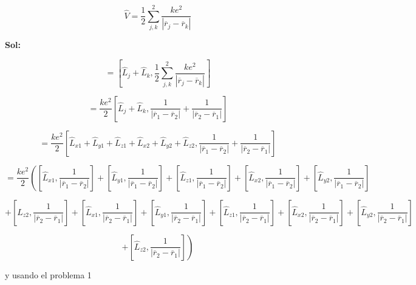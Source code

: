 \documentclass[12pt,a4paper]{article}
\begin{document}
\begin{enumerate}
\begin{equation*}
    \hat{V} = \frac{1}{2} \sum_{j,k}^{2} \frac{ke^2}{|\overline{r}_{j} - \overline{r}_k|}
\end{equation*}

\textbf{Sol:}

\begin{equation*}
    [\hat{L}_{jk},\hat{V}] =\left[\hat{L}_j + \hat{L}_k,\frac{1}{2} \sum_{j,k}^{2} \frac{ke^2}{|\overline{r}_{j} - \overline{r}_k|}\right]
\end{equation*}


\begin{equation*}
    =\frac{ke^2}{2}\left[\hat{L}_j + \hat{L}_k, \frac{1}{|\overline{r}_{1} - \overline{r}_2|} +\frac{1}{|\overline{r}_{2} - \overline{r}_1|}\right]
\end{equation*}

\begin{equation*}
    =\frac{ke^2}{2}\left[\hat{L}_{x1} + \hat{L}_{y1} + \hat{L}_{z1} + \hat{L}_{x2}+ \hat{L}_{y2} + \hat{L}_{z2}, \frac{1}{|\overline{r}_{1} - \overline{r}_2|} +\frac{1}{|\overline{r}_{2} - \overline{r}_1|}\right]
\end{equation*}

\begin{equation*}
    =\frac{ke^2}{2}\left([\hat{L}_{x1},\frac{1}{|\overline{r}_{1} - \overline{r}_2|}] + [\hat{L}_{y1},\frac{1}{|\overline{r}_{1} - \overline{r}_2|}] + [\hat{L}_{z1},\frac{1}{|\overline{r}_{1} - \overline{r}_2|}] + [\hat{L}_{x2},\frac{1}{|\overline{r}_{1} - \overline{r}_2|}]+ [\hat{L}_{y2},\frac{1}{|\overline{r}_{1} - \overline{r}_2|}]  \right.
\end{equation*}

\begin{equation*}
    + [\hat{L}_{z2},\frac{1}{|\overline{r}_{2} - \overline{r}_1|}] +[\hat{L}_{x1},\frac{1}{|\overline{r}_{2} - \overline{r}_1|}] + [\hat{L}_{y1},\frac{1}{|\overline{r}_{2} - \overline{r}_1|}] + [\hat{L}_{z1},\frac{1}{|\overline{r}_{2} - \overline{r}_1|}] + [\hat{L}_{x2},\frac{1}{|\overline{r}_{2} - \overline{r}_1|}]+ [\hat{L}_{y2},\frac{1}{|\overline{r}_{2} - \overline{r}_1|}] 
\end{equation*}

\begin{equation*}
    \left.+ [\hat{L}_{z2},\frac{1}{|\overline{r}_{2} - \overline{r}_1|}] \right)
\end{equation*}

y usando el problema 1


\end{enumerate}
\end{document}
